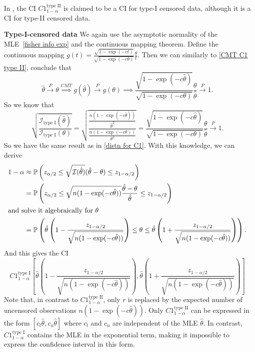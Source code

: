 In \cite{Sundberg2001}, the CI $C1^{\text{type II}}_{1 - \alpha}$ is claimed to be a CI for type-I censored data, although it is a CI for type-II censored data.

\textbf{Type-I-censored data}
We again use the asymptotic normality of the MLE~\eqref{fisher info exp} and the continuous mapping theorem. Define the continuous mapping $g(t) = \frac{\sqrt{1 - \exp(-ct)}}{\sqrt{1 - \exp(-c \theta)}} \frac{\theta}{t}$. Then we can similarly to \eqref{CMT C1 type II}, conclude that
\begin{equation*}
	\hat \theta 
	\overset{P}{\rightarrow}
	\theta
	\overset{CMT}{\implies}
	g(\hat \theta) 
	\overset{P}{\rightarrow}
	g(\theta)
	\implies
	\frac{\sqrt{1 - \exp(-c \hat \theta)}}{\sqrt{1 - \exp(-c \theta)}} \frac{\theta}{\hat \theta}
	\overset{P}{\rightarrow}
	1.
\end{equation*}  
So we know that 
\begin{equation*}
	\sqrt{\frac{\mathcal I_{\text{type I}} (\hat \theta)}{\mathcal I_{\text{type I}} (\theta)}} 
	=
	\sqrt{\frac{
			\frac{n(1 - \exp(-c \hat \theta))}{\hat \theta^2}	
	}{
			\frac{n(1 - \exp(-c \theta))}{\theta^2}
	}}
	=
	\frac{\sqrt{1 - \exp(-c \hat \theta)}}{\sqrt{1 - \exp(-c \theta)}} \frac{\theta}{\hat \theta} 
	\overset{P}{\rightarrow}
	1.
\end{equation*}
So we have the same result as in \eqref{distn for C1}. With this knowledge, we can derive
\begin{align*}
	1 - \alpha 
	&\approx
	\mathbb{P} \left( 
	z_{\alpha / 2} \leq \sqrt{\mathcal I (\hat \theta)} (\hat \theta - \theta)
	\leq 
	z_{1 - \alpha / 2} 
	\right) \\
	&=
	\mathbb{P} \left( 
	z_{\alpha / 2} \leq 
	\sqrt{n (1 - \exp(-c \hat \theta))} \frac{\hat \theta - \theta}{\hat \theta} 
	\leq 
	z_{1 - \alpha / 2} 
	\right) \\
\intertext{and solve it algebraically for $\theta$}
	&=
	\mathbb{P} \left( 
	\hat \theta \left( 1 - \frac{z_{1 - \alpha / 2}}{\sqrt{n (1 - \exp(-c \hat \theta))}} \right)
	\leq
	\theta
	\leq
	\hat \theta \left( 1 + \frac{z_{1 - \alpha / 2}}{\sqrt{n (1 - \exp(-c \hat \theta))}} \right)
	\right).
\end{align*}
And this gives the CI
\begin{equation*}
	C1^{\text{type I}}_{1 - \alpha}
	\left[
	\hat \theta \left( 1 - \frac{z_{1 - \alpha / 2}}{\sqrt{n (1 - \exp(-c \hat \theta))}} \right), 
	\hat \theta \left( 1 + \frac{z_{1 - \alpha / 2}}{\sqrt{n (1 - \exp(-c \hat \theta))}} \right)
	\right]
\end{equation*}
Note that, in contrast to $C1^{\text{type II}}_{1-\alpha}$, only $r$ is replaced by the expected number of uncensored observations $n(1-\exp(-c\hat{\theta}))$. Only $C1^{\text{type II}}_{1-\alpha}$ can be expressed in the form $[c_l\hat{\theta}, c_u\hat{\theta}]$ where $c_l$ and $c_u$ are independent of the MLE $\hat{\theta}$. In contrast, $C1^{\text{type I}}_{1-\alpha}$ contains the MLE in the exponential term, making it impossible to express the confidence interval in this form.

